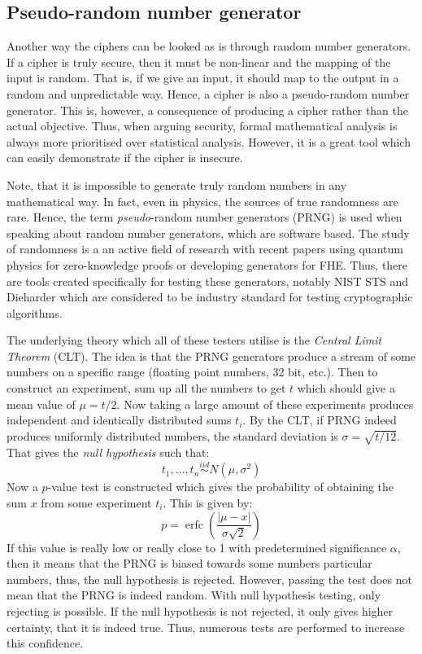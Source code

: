 \documentclass{Resources/UoBLab1}
\theoremstyle{definition}
\begin{document}
\subsection{Pseudo-random number generator}
Another way the ciphers can be looked as is through random number generators. If a cipher is truly secure, then it must be non-linear and the mapping of the input is random. That is, if we give an input, it should map to the output in a random and unpredictable way. Hence, a cipher is also a pseudo-random number generator. This is, however, a consequence of producing a cipher rather than the actual objective. Thus, when arguing security, formal mathematical analysis is always more prioritised over statistical analysis. However, it is a great tool which can easily demonstrate if the cipher is insecure.

Note, that it is impossible to generate truly random numbers in any mathematical way. In fact, even in physics, the sources of true randomness are rare. Hence, the term \textit{pseudo}-random number generators (PRNG) is used when speaking about random number generators, which are software based. The study of randomness is a an active field of research with recent papers using quantum physics for zero-knowledge proofs\cite{QuantumZK} or developing generators for FHE\cite{LatticeRNG}. Thus, there are tools created specifically for testing these generators, notably NIST STS\cite{NIST} and Dieharder\cite{Dieharder} which are considered to be industry standard for testing cryptographic algorithms\cite{AESNI}.

The underlying theory which all of these testers utilise is the \textit{Central Limit Theorem} (CLT). The idea is that the PRNG generators produce a stream of some numbers on a specific range (floating point numbers, 32 bit, etc.). Then to construct an experiment, sum up all the numbers to get $t$ which should give a mean value of $\mu = t/2$. Now taking a large amount of these experiments produces independent and identically distributed sums $t_i$. By the CLT, if PRNG indeed produces uniformly distributed numbers, the standard deviation is $\sigma = \sqrt{t/12}$. That gives the \textit{null hypothesis} such that:
\[
    t_1, ..., t_n \overset{iid}{\sim} N(\mu, \sigma^2)
\]
Now a $p$-value test is constructed which gives the probability of obtaining the sum $x$ from some experiment $t_i$. This is given by:
\[
    p = \operatorname{erfc}\left(\frac{|\mu - x|}{\sigma\sqrt{2}}\right)
\]
If this value is really low or really close to 1 with predetermined significance $\alpha$, then it means that the PRNG is biased towards some numbers particular numbers, thus, the null hypothesis is rejected. However, passing the test does not mean that the PRNG is indeed random. With null hypothesis testing, only rejecting is possible. If the null hypothesis is not rejected, it only gives higher certainty, that it is indeed true. Thus, numerous tests are performed to increase this confidence.\medskip
\end{document}
